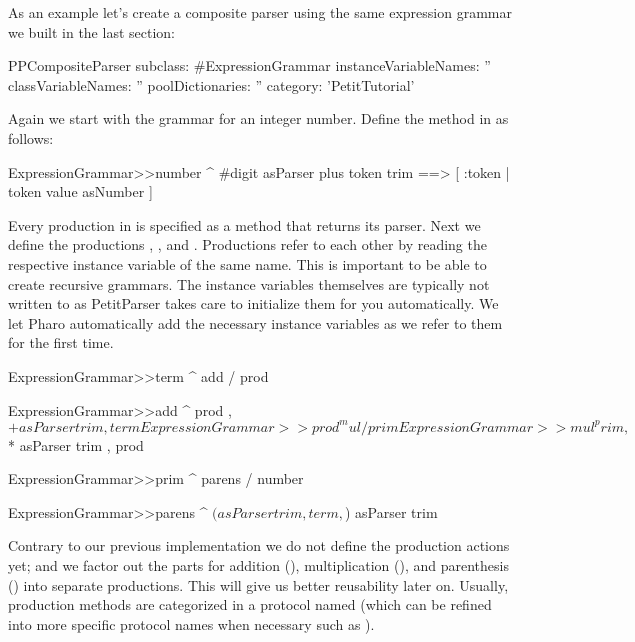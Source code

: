 \documentclass[a4paper,10pt,twoside]{book}
\begin{document}
As an example let's create a composite parser using the same
expression grammar we built in the last section:

\begin{code}{}
PPCompositeParser subclass: #ExpressionGrammar
   instanceVariableNames: ''
   classVariableNames: ''
   poolDictionaries: ''
   category: 'PetitTutorial'
\end{code}

Again we start with the grammar for an integer number. Define the
method  in  as follows:

\begin{code}{}
ExpressionGrammar>>number
   ^ #digit asParser plus token trim ==> [ :token | token value asNumber ]
\end{code}

Every production in  is specified as a method
that returns its parser. Next we define the productions ,
, and . Productions refer to each other by reading
the respective instance variable of the same name. This is important
to be able to create recursive grammars. The instance variables
themselves are typically not written to as PetitParser takes care to
initialize them for you automatically. We let Pharo automatically add
the necessary instance variables as we refer to them for the first
time.

\begin{code}{}
ExpressionGrammar>>term
   ^ add / prod

ExpressionGrammar>>add
   ^ prod , $+ asParser trim , term

ExpressionGrammar>>prod
   ^ mul / prim

ExpressionGrammar>>mul
   ^ prim , $* asParser trim , prod

ExpressionGrammar>>prim
   ^ parens / number

ExpressionGrammar>>parens
   ^ $( asParser trim , term , $) asParser trim
\end{code}

Contrary to our previous implementation we do not define the
production actions yet; and we factor out the parts for addition
(), multiplication (), and parenthesis ()
into separate productions. This will give us better reusability later
on. Usually, production methods are categorized in a protocol named
 (which can be refined into more specific protocol names
when necessary such as ).
\end{document}
